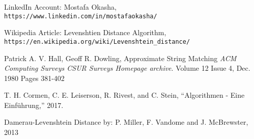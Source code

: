 \documentclass[12pt]{article}
\begin{document}
\newpage

\begin{thebibliography}{9}

LinkedIn Account: Mostafa Okasha,
\\\texttt{https://www.linkedin.com/in/mostafaokasha/}

Wikipedia Article: Levenshtien Distance Algorithm,
\\\texttt{https://en.wikipedia.org/wiki/Levenshtein\_{}distance/}

Patrick A. V. Hall, Geoff R. Dowling,
 Approximate String Matching
\textit{ACM Computing Surveys CSUR Surveys Homepage archive}.
Volume 12 Issue 4, Dec. 1980 Pages 381-402 

T. H. Cormen, C. E. Leiserson, R. Rivest, and C. Stein, “Algorithmen - Eine Einführung,” 2017.

Damerau-Levenshtein Distance by: P. Miller, F. Vandome and J. McBrewster, 2013



\end{thebibliography}
\end{document}
